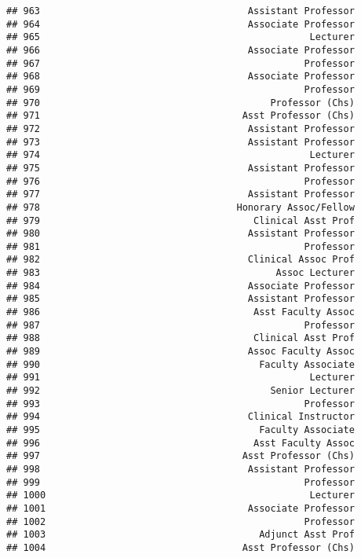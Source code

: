 \documentclass[
]{article}
\begin{document}
\begin{verbatim}
## 963                                     Assistant Professor
## 964                                     Associate Professor
## 965                                                Lecturer
## 966                                     Associate Professor
## 967                                               Professor
## 968                                     Associate Professor
## 969                                               Professor
## 970                                         Professor (Chs)
## 971                                    Asst Professor (Chs)
## 972                                     Assistant Professor
## 973                                     Assistant Professor
## 974                                                Lecturer
## 975                                     Assistant Professor
## 976                                               Professor
## 977                                     Assistant Professor
## 978                                   Honorary Assoc/Fellow
## 979                                      Clinical Asst Prof
## 980                                     Assistant Professor
## 981                                               Professor
## 982                                     Clinical Assoc Prof
## 983                                          Assoc Lecturer
## 984                                     Associate Professor
## 985                                     Assistant Professor
## 986                                      Asst Faculty Assoc
## 987                                               Professor
## 988                                      Clinical Asst Prof
## 989                                     Assoc Faculty Assoc
## 990                                       Faculty Associate
## 991                                                Lecturer
## 992                                         Senior Lecturer
## 993                                               Professor
## 994                                     Clinical Instructor
## 995                                       Faculty Associate
## 996                                      Asst Faculty Assoc
## 997                                    Asst Professor (Chs)
## 998                                     Assistant Professor
## 999                                               Professor
## 1000                                               Lecturer
## 1001                                    Associate Professor
## 1002                                              Professor
## 1003                                      Adjunct Asst Prof
## 1004                                   Asst Professor (Chs)

\end{verbatim}
\end{document}
